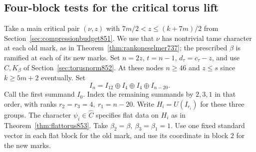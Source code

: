\documentclass[a4paper,11pt]{article}
\theoremstyle{definition}
\theoremstyle{remark}
\numberwithin{equation}{section}
\begin{document}
\subsection{Four-block tests for the critical torus lift}
\label{sec:fourblock854}
Take a main critical pair \((\nu,z)\) with
\(7m/2<z\le (k+7m)/2\) from Section~\ref{sec:compressionbudget851}.
We use that \(\nu\) has nontrivial tame character at each old mark,
as in Theorem~\ref{thm:rankoneselmer737}; the prescribed \(\beta\)
is ramified at each of its new marks. Set \(n=2z\),
\(t=n-1\), \(d_\tau=c_\tau-z\), and use \(C,K_\beta\) of
Section~\ref{sec:torusnorm852}. At these nodes \(n\ge46\) and
\(z\le s\) since \(k\ge5m+2\) eventually. Set
\[
   I_n=I_{12}\oplus I_4\oplus I_4\oplus I_{n-20}.
\]
Call the first summand \(I_0\). Index the remaining summands by
\(2,3,1\) in that order, with ranks \(r_2=r_3=4,\ r_1=n-20\).
Write \(H_i=U(I_{r_i})\) for these three groups. The character
\(\psi_i\in\widehat C\) specifies flat data on \(H_i\) as in
Theorem~\ref{thm:flattorus853}. Take
\(\beta_2=\beta,\ \beta_3=\beta_1=1\). Use one fixed standard
vector in each flat block for the old mark, and use its
coordinate in block \(2\) for the new marks.
\end{document}
